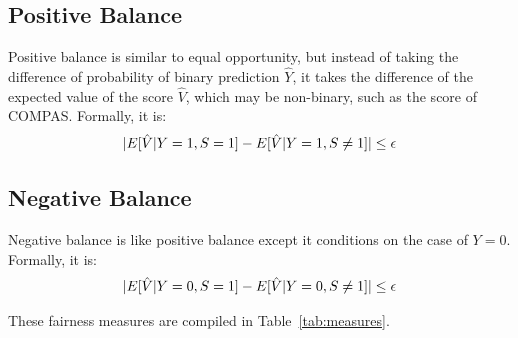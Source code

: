 \documentclass[conference]{IEEEtran}
\begin{document}
\subsection{Positive Balance}
Positive balance \cite{kleinberg2016inherent} is similar to equal opportunity, but instead of taking the difference of probability of binary prediction $\hat{Y}$, it takes the difference of the expected value of the score $\hat{V}$, which may be non-binary, such as the score of COMPAS. Formally, it is:
\begin{align*}
    \lvert E[\hat{V} | Y = 1, S = 1] - E[\hat{V} | Y = 1, S \neq 1]\rvert \leq \epsilon
\end{align*}

\subsection{Negative Balance}
Negative balance \cite{kleinberg2016inherent} is like positive balance except it conditions on the case of $Y = 0$. Formally, it is:
\begin{align*}
    \lvert E[\hat{V} | Y = 0, S = 1] - E[\hat{V} | Y = 0, S \neq 1]\rvert \leq \epsilon
\end{align*}

These fairness measures are compiled in Table~\ref{tab:measures}.
\end{document}
